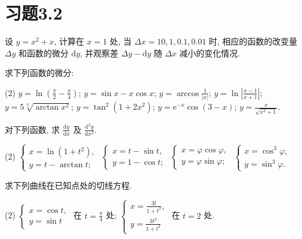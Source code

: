 \section{习题3.2}

\begin{exercise}[3.2.1]
    设 $y=x^2+x$, 计算在 $x=1$ 处, 当 $\Delta x = 10, 1, 0.1, 0.01$ 时, 相应的函数的改变量 $\Delta y$ 和函数的微分 $\mathrm{d}y$, 并观察差 $\Delta y - \mathrm{d}y$ 随 $\Delta x$ 减小的变化情况.
\end{exercise}

\begin{exercise}[3.2.2]
    求下列函数的微分:
    \begin{tasks}[label=(\arabic*)](2)
        \task $y=\ln(\frac{\pi}{2}-\frac{x}{4})$;
        \task $y = \sin x - x\cos x$;
        \task $y=\arccos\frac{1}{|x|}$;
        \task $y=\ln\left|\frac{x-1}{x+1}\right|$;
        \task $y=5\sqrt[3]{\arctan x^2}$;
        \task $y=\tan^2(1+2x^2)$;
        \task $y=\mathrm{e}^{-x}\cos(3-x)$;
        \task $y=\frac{x}{\sqrt{x^2+1}}$.
    \end{tasks}
\end{exercise}

\begin{exercise}[3.2.3]
    对下列函数, 求 $\frac{\mathrm{d}y}{\mathrm{d}x}$ 及 $\frac{\mathrm{d}^2y}{\mathrm{d}x^2}$.
    \begin{tasks}[label=(\arabic*)](2)
        \task $\begin{cases} x=\ln(1+t^2), \\ y=t-\arctan t; \end{cases}$
        \task $\begin{cases} x=t-\sin t, \\ y=1-\cos t; \end{cases}$
        \task $\begin{cases} x=\varphi\cos\varphi, \\ y=\varphi\sin\varphi; \end{cases}$
        \task $\begin{cases} x=\cos^3\varphi, \\ y=\sin^3\varphi. \end{cases}$
    \end{tasks}
\end{exercise}

\begin{exercise}[3.2.4]
    求下列曲线在已知点处的切线方程.
    \begin{tasks}[label=(\arabic*)](2)
        \task $\begin{cases} x=\cos t, \\ y=\sin t \end{cases}$ 在 $t=\frac{\pi}{4}$ 处;
        \task $\begin{cases} x=\frac{3t}{1+t^2}, \\ y=\frac{3t^2}{1+t^2} \end{cases}$ 在 $t=2$ 处.
    \end{tasks}
\end{exercise}

\newpage
